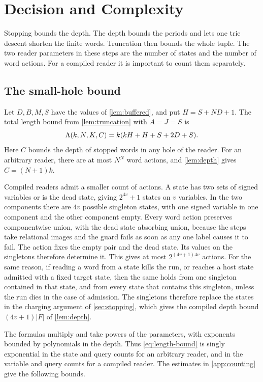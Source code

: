 \section{Decision and Complexity}
\label{sec:decision}

Stopping bounds the depth. The depth bounds the periods and lets
one trie descent shorten the finite words. Truncation then bounds
the whole tuple. The two reader parameters in these steps are the
number of states and the number of word actions. For a compiled
reader it is important to count them separately.

\subsection{The small-hole bound}

Let $D,B,M,S$ have the values of \cref{lem:buffered}, and put
$H=S+ND+1$. The total length bound from \cref{lem:truncation}
with $A=J=S$ is
\begin{equation}
  \Lambda(k,N,K,C)=k(kH+H+S+2D+S).
  \label{eq:length-bound}
\end{equation}
Here $C$ bounds the depth of stopped words in any hole of the reader.
For an arbitrary reader, there are at most $N^N$ word actions, and
\cref{lem:depth} gives $C=(N+1)k$.

Compiled readers admit a smaller count of actions. A state has two
sets of signed variables or is the dead state, giving $2^{4v}+1$
states on $v$ variables. In the two components there are $4v$
possible singleton states, with one signed variable in one component and
the other component empty. Every word action preserves componentwise
union, with the dead state absorbing union, because the steps take
relational images and the guard fails as soon as any one label
causes it to fail. The action fixes the empty pair and the dead
state. Its values on the singletons therefore determine it. This
gives at most $2^{(4v+1)4v}$ actions. For the same reason, if reading a
word from a state kills the run, or reaches a host state admitted with a
fixed target state, then the same holds from one singleton contained in
that state, and from every state that contains this singleton, unless the
run dies in the case of admission. The singletons therefore replace the states in
the charging argument of \cref{sec:stopping}, which gives the compiled
depth bound $(4v+1)|F|$ of \cref{lem:depth}.

The formulas multiply and take powers of the parameters, with exponents
bounded by polynomials in the depth. Thus \eqref{eq:length-bound}
is singly exponential in the state and query counts for an arbitrary
reader, and in the variable and query counts for a compiled reader.
The estimates in \cref{app:counting} give the following bounds.

